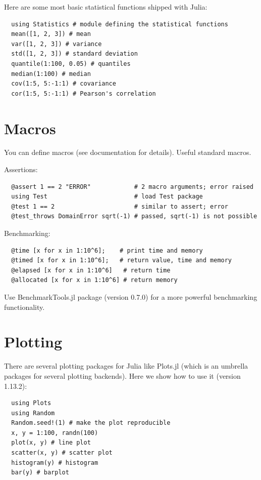 \documentclass[10pt,a4paper]{article}
\begin{document}
Here are some most basic statistical functions shipped with Julia:
\begin{lstlisting}
  using Statistics # module defining the statistical functions
  mean([1, 2, 3]) # mean
  var([1, 2, 3]) # variance
  std([1, 2, 3]) # standard deviation
  quantile(1:100, 0.05) # quantiles
  median(1:100) # median
  cov(1:5, 5:-1:1) # covariance
  cor(1:5, 5:-1:1) # Pearson's correlation
\end{lstlisting}

\section{Macros}
You can define macros (see documentation for details). Useful standard macros.

Assertions:
\begin{lstlisting}
  @assert 1 == 2 "ERROR"            # 2 macro arguments; error raised
  using Test                        # load Test package
  @test 1 == 2                      # similar to assert; error
  @test_throws DomainError sqrt(-1) # passed, sqrt(-1) is not possible
\end{lstlisting}

Benchmarking:
\begin{lstlisting}
  @time [x for x in 1:10^6];    # print time and memory
  @timed [x for x in 1:10^6];   # return value, time and memory
  @elapsed [x for x in 1:10^6]   # return time
  @allocated [x for x in 1:10^6] # return memory
\end{lstlisting}
Use BenchmarkTools.jl package (version 0.7.0) for a more powerful benchmarking functionality.

\section{Plotting}
There are several plotting packages for Julia like Plots.jl (which is
an umbrella packages for several plotting backends). Here we show how to use it
(version 1.13.2):
\begin{lstlisting}
  using Plots
  using Random
  Random.seed!(1) # make the plot reproducible
  x, y = 1:100, randn(100)
  plot(x, y) # line plot
  scatter(x, y) # scatter plot
  histogram(y) # histogram
  bar(y) # barplot
\end{lstlisting}
\end{document}
